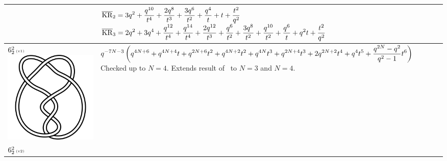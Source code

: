 \documentclass{compositio}
\theoremstyle{definition}
\numberwithin{equation}{section}
\begin{document}
{\begin{longtable}{p{}|p{}}
& 
$
\displaystyle{%
\overline{\KR}_{2} = 3 q^2+\frac{q^{10}}{t^4}+\frac{2 q^8}{t^3}+\frac{3 q^6}{t^2}+\frac{q^4}{t}+t+\frac{t^2}{q^2}
}
$
\newline 
$
\displaystyle{%
\overline{\KR}_{3} = 2 q^2+3 q^4+\frac{q^{12}}{t^4}+\frac{q^{14}}{t^4}+\frac{2 q^{12}}{t^3}+\frac{q^6}{t^2}+\frac{3 q^8}{t^2}+\frac{q^{10}}{t^2}+\frac{q^6}{t}+q^2 t+\frac{t^2}{q^2}
}
$
\\
\hline
$6_{2}^2\,\text{{\tiny (v1)}}$ 
\includegraphics[scale=0.07,angle=0]{link6_2_2.pdf} 
& 
$
\displaystyle{%
q^{-7 N-3} \left(q^{4 N+6}+q^{4 N+4} t+q^{2 N+6} t^2+q^{4 N+2} t^2+q^{4 N} t^3+q^{2 N+4} t^3+2 q^{2 N+2} t^4+q^4 t^5+\frac{q^{2 N} -q^2}{q^2-1} t^6\right)
}
$
\newline\newline\newline\newline
Checked up to $N=4$. Extends result of~\cite{r0508510} to $N=3$ and $N=4$.
\\
\hline
$6_{2}^2\,\text{{\tiny (v2)}}$ 

\end{longtable}}
\end{document}
